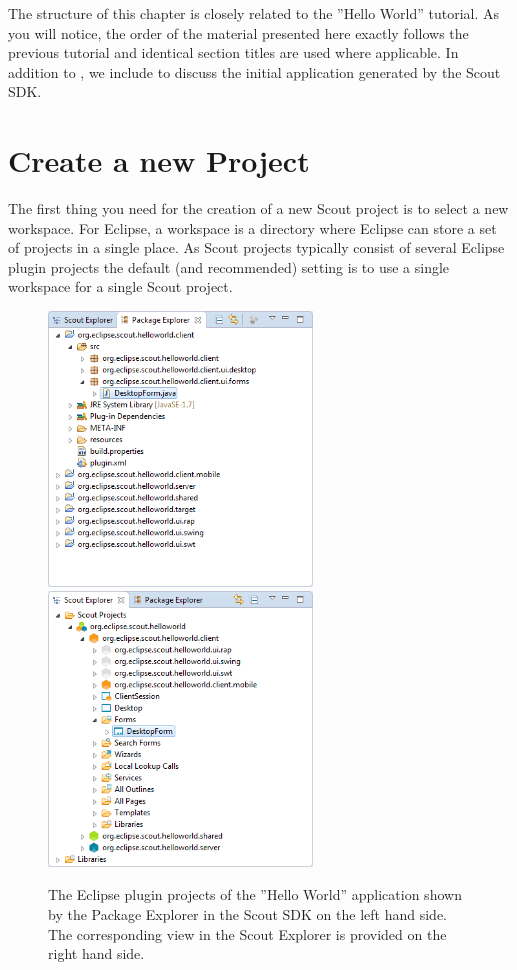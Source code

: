 \documentclass[a4paper,10pt,twoside]{book}
\begin{document}
The structure of this chapter is closely related to the ''Hello World'' tutorial.
As you will notice, the order of the material presented here exactly follows the previous tutorial and identical section titles are used where applicable.
In addition to , we include  to discuss the initial application generated by the Scout SDK.

\section{Create a new Project}

The first thing you need for the creation of a new Scout project is to select a new workspace.
For Eclipse, a workspace is a directory where Eclipse can store a set of projects in a single place.
As Scout projects typically consist of several Eclipse plugin projects the default (and recommended) setting is to use a single workspace for a single Scout project.

\begin{figure}
\includegraphics[width=7cm]{sdk_package_explorer.png} \hspace{0.5cm}
\includegraphics[width=7cm]{sdk_scout_explorer.png}
\caption{The Eclipse plugin projects of the ''Hello World'' application shown by the Package Explorer in the Scout SDK on the left hand side. 
The corresponding view in the Scout Explorer is provided on the right hand side.
}
\end{figure}
\end{document}
